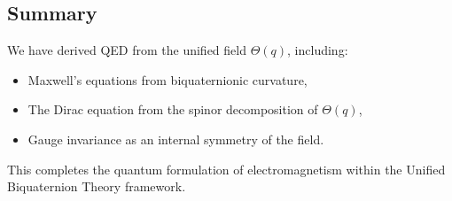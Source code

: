 \subsection*{Summary}

We have derived QED from the unified field \(\Theta(q)\), including:
\begin{itemize}
  \item Maxwell's equations from biquaternionic curvature,
  \item The Dirac equation from the spinor decomposition of \(\Theta(q)\),
  \item Gauge invariance as an internal symmetry of the field.
\end{itemize}

This completes the quantum formulation of electromagnetism within the Unified Biquaternion Theory framework.
